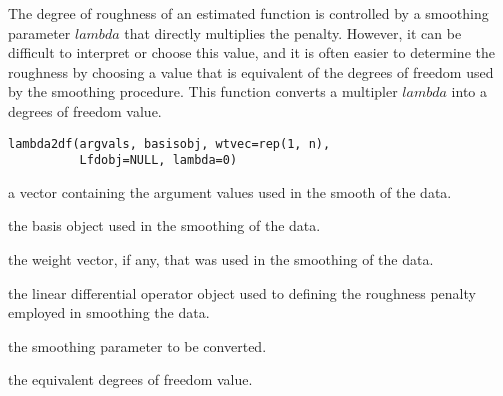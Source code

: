 \begin{Description}\relax
The degree of roughness of an estimated function is controlled by a
smoothing parameter $lambda$ that directly multiplies the penalty.
However, it can be difficult to interpret or choose this value, and it
is often easier to determine the roughness by choosing a value that is
equivalent of the degrees of freedom used by the smoothing procedure.
This function converts a multipler $lambda$ into a degrees of freedom value.
\end{Description}
\begin{Usage}
\begin{verbatim}
lambda2df(argvals, basisobj, wtvec=rep(1, n),
          Lfdobj=NULL, lambda=0)
\end{verbatim}
\end{Usage}
\begin{Arguments}
\begin{ldescription}
\item[\code{argvals}] a vector containing the argument values used in the
smooth of the data.

\item[\code{basisobj}] the basis object used in the smoothing of the data.

\item[\code{wtvec}] the weight vector, if any, that was used in the smoothing
of the data.

\item[\code{Lfdobj}] the linear differential operator object used to defining
the roughness penalty employed in smoothing the data.

\item[\code{lambda}] the smoothing parameter to be converted.

\end{ldescription}
\end{Arguments}
\begin{Value}
the equivalent degrees of freedom value.
\end{Value}
\begin{SeeAlso}\relax
{}
\end{SeeAlso}

